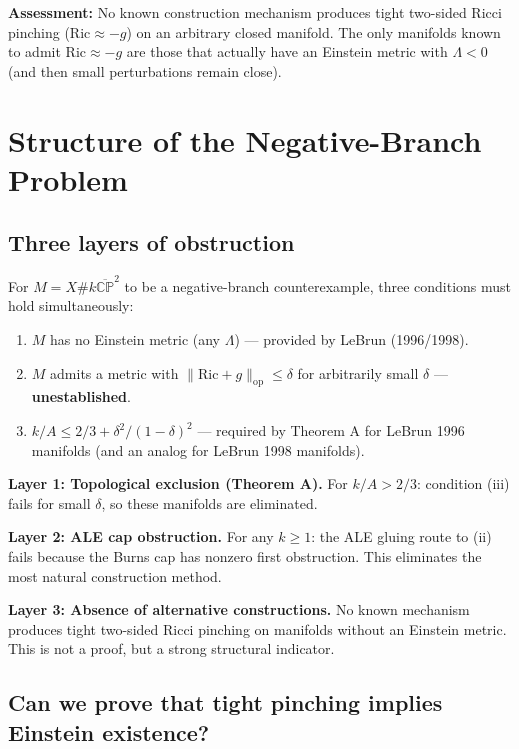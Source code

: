 \textbf{Assessment:} No known construction mechanism produces tight two-sided Ricci
pinching ($\mathrm{Ric} \approx -g$) on an arbitrary closed manifold. The only manifolds
known to admit $\mathrm{Ric} \approx -g$ are those that actually have an Einstein metric
with $\Lambda < 0$ (and then small perturbations remain close).


\section{Structure of the Negative-Branch Problem}

\subsection{Three layers of obstruction}

For $M = X \# k\overline{\mathbb{CP}}^2$ to be a negative-branch counterexample,
three conditions must hold simultaneously:
\begin{enumerate}
\item[(i)] $M$ has no Einstein metric (any $\Lambda$) --- provided by LeBrun (1996/1998).
\item[(ii)] $M$ admits a metric with $\|\mathrm{Ric} + g\|_{\mathrm{op}} \leq \delta$ for
      arbitrarily small $\delta$ --- \textbf{unestablished}.
\item[(iii)] $k/A \leq 2/3 + \delta^2/(1-\delta)^2$ --- required by Theorem A for
      LeBrun 1996 manifolds (and an analog for LeBrun 1998 manifolds).
\end{enumerate}

\textbf{Layer 1: Topological exclusion (Theorem A).}
For $k/A > 2/3$: condition (iii) fails for small $\delta$, so these manifolds are eliminated.

\textbf{Layer 2: ALE cap obstruction.}
For any $k \geq 1$: the ALE gluing route to (ii) fails because the Burns cap has nonzero
first obstruction. This eliminates the most natural construction method.

\textbf{Layer 3: Absence of alternative constructions.}
No known mechanism produces tight two-sided Ricci pinching on manifolds without
an Einstein metric. This is not a proof, but a strong structural indicator.

\subsection{Can we prove that tight pinching implies Einstein existence?}


